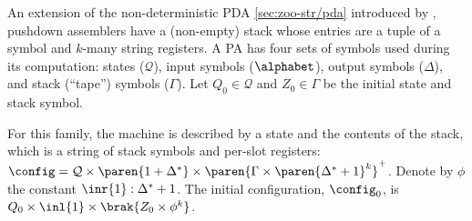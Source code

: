 An extension of the non-deterministic PDA \autoref{sec:zoo-str/pda}
introduced by \cite{aho:pa}, pushdown assemblers have a (non-empty) stack
whose entries are a tuple of a symbol and $k$-many string registers.  A PA
has four sets of symbols used during its computation: states
($\mathcal{Q}$), input symbols ($\alphabet$), output symbols ($\Delta$), and
stack (``tape'') symbols ($\Gamma$).  Let $Q_0 \in \mathcal{Q}$ and $Z_0 \in
\Gamma$ be the initial state and stack symbol.

For this family, the machine is described by a state and the contents of the
stack, which is a string of stack symbols and per-slot registers: $\config =
\mathcal{Q} \times \paren{1 + \Delta^*} \times \paren{ \Gamma \times
\paren{\Delta^* + 1}^k }^+$.  Denote by $\phi$ the constant $\inr{1} :
\Delta^* + 1$.  The initial configuration, $\config_0$, is $Q_0 \times
\inl{1} \times \brak{Z_0 \times \phi^k}$.

